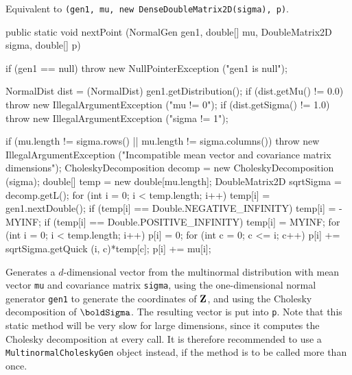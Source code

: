 \begin{tabb} Equivalent to
 \texttt{(gen1, mu, new DenseDoubleMatrix2D(sigma), p)}.
\end{tabb}
\begin{code}

   public static void nextPoint (NormalGen gen1, double[] mu,
                                 DoubleMatrix2D sigma, double[] p)\begin{hide} {
      if (gen1 == null)
         throw new NullPointerException ("gen1 is null");

      NormalDist dist = (NormalDist) gen1.getDistribution();
      if (dist.getMu() != 0.0)
         throw new IllegalArgumentException ("mu != 0");
      if (dist.getSigma() != 1.0)
         throw new IllegalArgumentException ("sigma != 1");

      if (mu.length != sigma.rows() ||
          mu.length != sigma.columns())
         throw new IllegalArgumentException
            ("Incompatible mean vector and covariance matrix dimensions");
      CholeskyDecomposition decomp = new CholeskyDecomposition (sigma);
      double[] temp = new double[mu.length];
      DoubleMatrix2D sqrtSigma = decomp.getL();
      for (int i = 0; i < temp.length; i++) {
         temp[i] = gen1.nextDouble();
         if (temp[i] == Double.NEGATIVE_INFINITY)
            temp[i] = -MYINF;
         if (temp[i] == Double.POSITIVE_INFINITY)
            temp[i] = MYINF;
      }
      for (int i = 0; i < temp.length; i++) {
         p[i] = 0;
         for (int c = 0; c <= i; c++)
            p[i] += sqrtSigma.getQuick (i, c)*temp[c];
         p[i] += mu[i];
      }
   }\end{hide}
\end{code}
\begin{tabb} Generates a $d$-dimensional vector from the multinormal
 distribution with mean vector \texttt{mu} and covariance matrix
 \texttt{sigma}, using the one-dimensional normal generator \texttt{gen1} to
 generate the coordinates of $\textbf{Z}$, and using the Cholesky decomposition of
 $\bSigma$. The resulting vector is put into \texttt{p}.
 Note that this static method will be very slow for large dimensions, since
 it computes the Cholesky decomposition at every call. It is therefore
 recommended to use a \texttt{MultinormalCholeskyGen} object instead,
 if the method is to be called more than once.
\end{tabb}
\begin{htmlonly}
\end{htmlonly}
